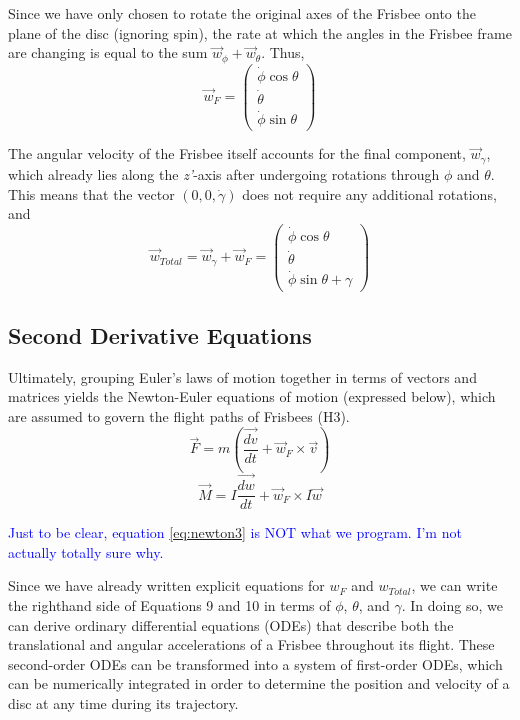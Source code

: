 \documentclass[a4paper,12pt, oneside]{article}
\newcommand{\blue}[1]{\textcolor{blue}{#1}}
\begin{document}
Since we have only chosen to rotate the original axes of the Frisbee onto the plane of the disc (ignoring spin), the rate at which the angles in the Frisbee frame are changing is equal to the sum $\vec{w}_\phi+\vec{w}_\theta$. Thus,
\begin{equation*}
\vec{w}_F=\left(\begin{array}{ccc}\dot\phi\cos\theta\\\dot\theta\\\dot\phi\sin\theta\end{array} \right)
\end{equation*}

The angular velocity of the Frisbee itself accounts for the final component, $\vec{w}_\gamma$, which already lies along the \textit{z'}-axis after undergoing rotations through $\phi$ and $\theta$. This means that the vector $(0, 0, \dot\gamma)$ does not require any additional rotations, and 
\begin{equation*}
\vec{w}_{Total}=\vec{w}_\gamma+\vec{w}_F=\left(\begin{array}{ccc}\dot\phi\cos\theta\\\dot\theta\\\dot\phi\sin\theta+\gamma\end{array} \right)
\end{equation*}

\subsection{Second Derivative Equations}

Ultimately, grouping Euler's laws of motion together in terms of vectors and matrices yields the Newton-Euler equations of motion (expressed below), which are assumed to govern the flight paths of Frisbees (H3). 
\begin{equation}
  \label{eq:newton3}
  \vec{F}=\textit{m}(\dfrac{\vec{dv}}{dt}+\vec{\textit{w}}_F\times\vec{v})
\end{equation}
\begin{equation}
  \label{eq:newton4}
  \vec{M}=I\dfrac{\vec{dw}}{dt}+\vec{\textit{w}}_F\times I \vec{w}
\end{equation}

\blue{Just to be clear, equation \ref{eq:newton3} is NOT what we program. I'm not actually totally sure why.}

Since we have already written explicit equations for $\textit{w}_F$ and $\textit{w}_{Total}$, we can write the righthand side of Equations 9 and 10 in terms of $\phi$, $\theta$, and $\gamma$. In doing so, we can derive ordinary differential equations (ODEs) that describe both the translational and angular accelerations of a Frisbee throughout its flight. These second-order ODEs can be transformed into a system of first-order ODEs, which can be numerically integrated in order to determine the position and velocity of a disc at any time during its trajectory. 
\end{document}
